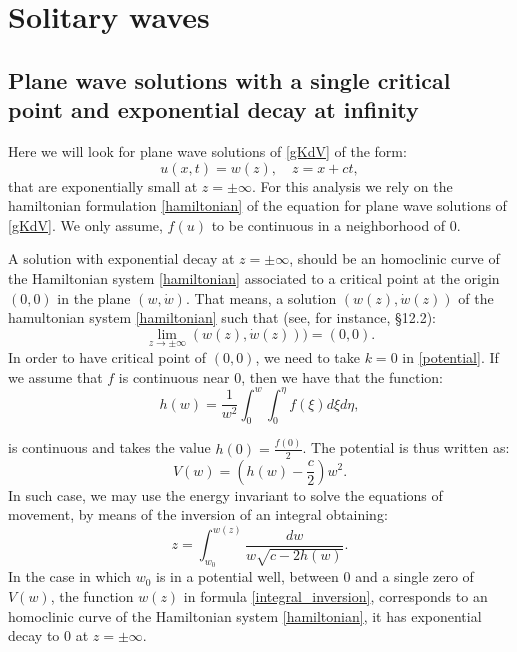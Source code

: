 \documentclass[
11pt,%
tightenlines,%
twoside,%
onecolumn,%
nofloats,%
nobibnotes,%
nofootinbib,%
superscriptaddress,%
noshowpacs,%
centertags]%
{revtex4}
\begin{document}
\section{Solitary waves }
\subsection{Plane wave solutions with a single critical point and exponential decay at infinity}
Here we will look for plane wave solutions of \eqref{gKdV} of the form:
\begin{equation}
u(x,t) = w(z), \quad z = x+ct,
\end{equation}
that are exponentially small at $z = \pm \infty$. For this analysis we rely on the hamiltonian formulation \eqref{hamiltonian} of the equation for plane wave solutions of \eqref{gKdV}. We only assume, $f(u)$ to be continuous in a neighborhood of $0$. 

A solution with exponential decay at $z = \pm \infty$, should be an homoclinic curve of the Hamiltonian system \eqref{hamiltonian} associated to a critical point at the origin $(0,0)$ in the plane $(w,\dot w)$. That means, a solution $(w(z),\dot w(z))$ of the hamultonian system \eqref{hamiltonian} such that (see, for instance, \cite{Arnold1978} \S 12.2):
\begin{equation}
\lim_{z\to \pm\infty}(w(z),\dot w(z))) = (0,0).
\end{equation}
In order to have critical point of $(0,0)$, we need to take $k = 0$ in \eqref{potential}. If we assume that $f$ is continuous near $0$, then we have that the function:
\begin{equation}
h(w) = \frac{1}{w^2}\int_0^w \int_0^\eta f(\xi)d\xi d\eta,
\end{equation}

is continuous and takes the value $h(0) = \frac{f(0)}{2}$. The potential is thus written as:
\begin{equation}\label{potential2}
V(w) = \left(h(w) - \frac{c}{2} \right)w^2.
\end{equation}
In such case, we may use the energy invariant to solve the equations of movement, by means of the inversion of an integral obtaining:
\begin{equation}\label{integral_inversion}
z = \int_{w_0}^{w(z)} \frac{dw}{w\sqrt{c - 2h(w)}}.
\end{equation}
In the case in which $w_0$ is in a potential well, between $0$ and a single zero of $V(w)$, the function $w(z)$ in formula \eqref{integral_inversion}, corresponds to an homoclinic curve of the Hamiltonian system \eqref{hamiltonian}, it has exponential decay to $0$ at $z = \pm \infty$. 
\end{document}

